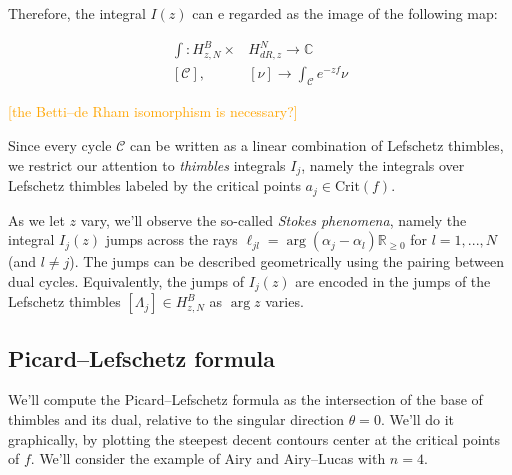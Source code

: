 \documentclass{article}
\theoremstyle{definition}
\newcommand{\R}{\mathbb{R}}
\newcommand{\C}{\mathbb{C}}
\theoremstyle{plain}
\begin{document}
Therefore, the integral $I(z)$ can e regarded as the image of the following map: 

\begin{align*}
    \int \colon  H_{z,N}^{B} \times & H_{dR,z}^N \to \C \\
       [\mathcal{C}] ,\,\, & [\nu] \to \int_{\mathcal{C}}e^{-zf}\nu
\end{align*}

\textcolor{orange}{[the Betti--de Rham isomorphism is necessary?]}

Since every cycle $\mathcal{C}$ can be written as a linear combination of Lefschetz thimbles, we restrict our attention to  \textit{thimbles} integrals $I_j$, namely the integrals over Lefschetz thimbles labeled by the critical points $a_j\in\text{Crit}(f)$.

As we let $z$ vary, we’ll observe the so-called \textit{Stokes phenomena}, namely the integral $I_j(z)$ jumps across the rays $\ell_{jl}=\arg(\alpha_j-\alpha_l)\R_{\geq 0}$ for $l=1,...,N$ (and $l\neq j$). The jumps can be described geometrically using the pairing between dual cycles. Equivalently, the jumps of $I_j(z)$ are encoded in the jumps of the Lefschetz thimbles $[\Lambda_j]\in H_{z,N}^B$ as $\arg z$ varies. %

\subsection{Picard--Lefschetz formula}\label{sec:Picard-Lefschetz}
We'll compute the Picard--Lefschetz formula as the intersection of the base of thimbles and its dual, relative to the singular direction $\theta=0$. We'll do it graphically, by plotting the steepest decent contours center at the critical points of $f$. We'll consider the example of Airy and Airy--Lucas with $n=4$.
\end{document}
